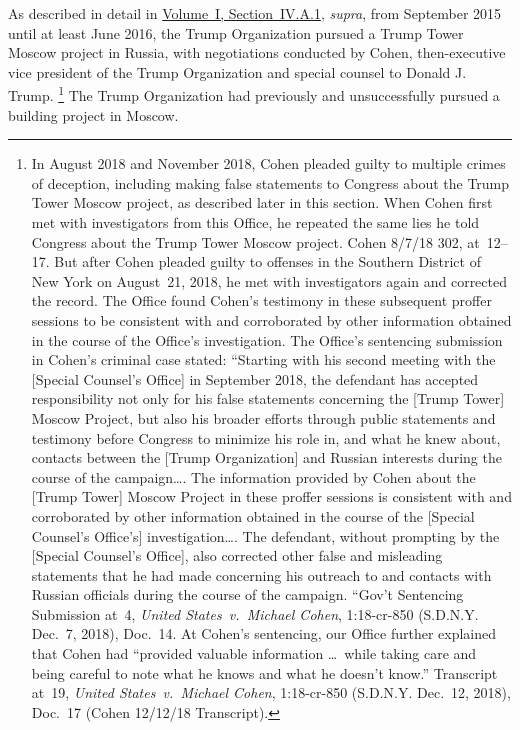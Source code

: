 As described in detail in \hyperlink{subsubsection.1.4.1.1}{Volume~I, Section~IV.A.1}, \textit{supra}, from September 2015 until at least June 2016, the Trump Organization pursued a Trump Tower Moscow project in Russia, with negotiations conducted by Cohen, then-executive vice president of the Trump Organization and special counsel to Donald J. Trump.%
\footnote{In August 2018 and November 2018, Cohen pleaded guilty to multiple crimes of deception, including making false statements to Congress about the Trump Tower Moscow project, as described later in this section.
When Cohen first met with investigators from this Office, he repeated the same lies he told Congress about the Trump Tower Moscow project.
Cohen 8/7/18 302, at~12--17.
But after Cohen pleaded guilty to offenses in the Southern District of New York on August~21, 2018, he met with investigators again and corrected the record.
The Office found Cohen's testimony in these subsequent proffer sessions to be consistent with and corroborated by other information obtained in the course of the Office's investigation.
The Office's sentencing submission in Cohen's criminal case stated: ``Starting with his second meeting with the [Special Counsel's Office] in September 2018, the defendant has accepted responsibility not only for his false statements concerning the [Trump Tower] Moscow Project, but also his broader efforts through public statements and testimony before Congress to minimize his role in, and what he knew about, contacts between the [Trump Organization] and Russian interests during the course of the campaign\dots.
The information provided by Cohen about the [Trump Tower] Moscow Project in these proffer sessions is consistent with and corroborated by other information obtained in the course of the [Special Counsel's Office's] investigation\dots.
The defendant, without prompting by the [Special Counsel's Office], also corrected other false and misleading statements that he had made concerning his outreach to and contacts with Russian officials during the course of the campaign.
``Gov't Sentencing Submission at~4, \textit{United States~v.\ Michael Cohen}, 1:18-cr-850 (S.D.N.Y. Dec.~7, 2018), Doc.~14.
At Cohen's sentencing, our Office further explained that Cohen had ``provided valuable information \dots\ while taking care and being careful to note what he knows and what he doesn't know.''
Transcript at~19, \textit{United States~v.\ Michael Cohen}, 1:18-cr-850 (S.D.N.Y. Dec.~12, 2018), Doc.~17 (Cohen 12/12/18 Transcript).}
The Trump Organization had previously and unsuccessfully pursued a building project in Moscow.%
